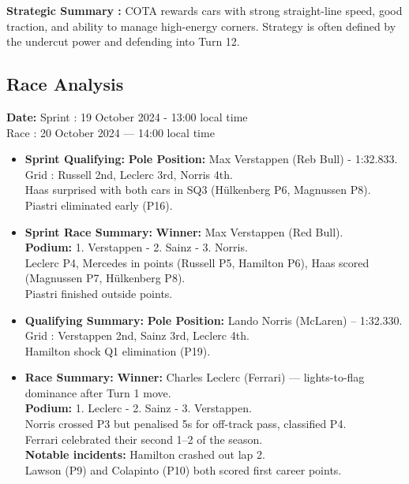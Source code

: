\textbf{Strategic Summary :} COTA rewards cars with strong straight-line speed, good traction, and ability to manage high-energy corners. Strategy is often defined by the undercut power and defending into Turn 12.

\subsection{Race Analysis}

\textbf{Date:} Sprint : 19 October 2024 - 13:00 local time\\
Race : 20 October 2024 — 14:00 local time 

\begin{itemize}
    \item \textbf{Sprint Qualifying:} \textbf{Pole Position:} Max Verstappen (Reb Bull) - 1:32.833.\\
    Grid : Russell 2nd, Leclerc 3rd, Norris 4th. \\
    Haas surprised with both cars in SQ3 (Hülkenberg P6, Magnussen P8). Piastri eliminated early (P16).
    
    \item \textbf{Sprint Race Summary:} \textbf{Winner:} Max Verstappen (Red Bull). \\
    \textbf{Podium:} 1. Verstappen - 2. Sainz - 3. Norris. \\
    Leclerc P4, Mercedes in points (Russell P5, Hamilton P6), Haas scored (Magnussen P7, Hülkenberg P8). \\
    Piastri finished outside points.
    
    \item \textbf{Qualifying Summary:} \textbf{Pole Position:} Lando Norris (McLaren) – 1:32.330. \\
    Grid : Verstappen 2nd, Sainz 3rd, Leclerc 4th. \\
    Hamilton shock Q1 elimination (P19).
    
    \item \textbf{Race Summary:} \textbf{Winner:} Charles Leclerc (Ferrari) — lights-to-flag dominance after Turn 1 move. \\
    \textbf{Podium:} 1. Leclerc - 2. Sainz - 3. Verstappen. \\
    Norris crossed P3 but penalised 5s for off-track pass, classified P4. \\
    Ferrari celebrated their second 1–2 of the season. \\
    \textbf{Notable incidents:} Hamilton crashed out lap 2. \\
    Lawson (P9) and Colapinto (P10) both scored first career points.
    

\end{itemize}
